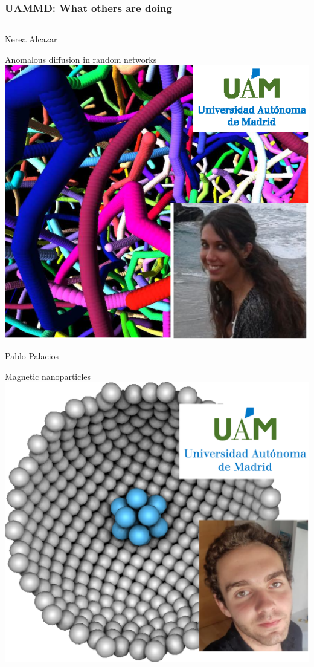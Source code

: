\documentclass[xcolor=dvipsnames, compress]{beamer}
\begin{document}
\begin{frame}
  \frametitle{UAMMD: What others are doing}
  \vspace*{-10pt}
  \begin{columns}[T]
    \begin{column}{0.32\linewidth}
      \begin{block}{Nerea Alcazar}
        \begin{center}
          \scriptsize Anomalous diffusion in random networks\newline
          \includegraphics[height=0.3\paperheight]{nerea}
        \end{center}
      \end{block}
      \vspace*{-7pt}
      \begin{block}{Pablo Palacios}
        \begin{center}
          \scriptsize Magnetic nanoparticles\newline
          \includegraphics[height=0.25\paperheight]{palacios}

\end{center}
\end{block}
\end{column}
\end{columns}
\end{frame}
\end{document}
